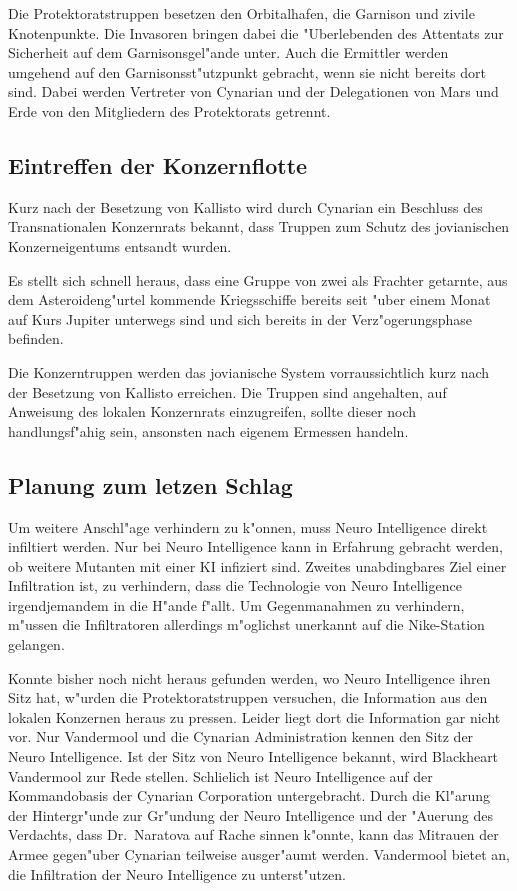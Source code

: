 Die Protektoratstruppen besetzen den Orbitalhafen, die Garnison und zivile Knotenpunkte. Die Invasoren bringen dabei die "Uberlebenden des Attentats zur Sicherheit auf dem Garnisonsgel"ande unter. Auch die Ermittler werden umgehend auf den Garnisonsst"utzpunkt gebracht, wenn sie nicht bereits dort sind. Dabei werden Vertreter von Cynarian und der Delegationen von Mars und Erde von den Mitgliedern des Protektorats getrennt.

\subsection{Eintreffen der Konzernflotte}

Kurz nach der Besetzung von Kallisto wird durch Cynarian ein Beschluss des Transnationalen Konzernrats bekannt, dass Truppen zum Schutz des jovianischen Konzerneigentums entsandt wurden.

Es stellt sich schnell heraus, dass eine Gruppe von zwei als Frachter getarnte, aus dem Asteroideng"urtel kommende Kriegsschiffe bereits seit "uber einem Monat auf Kurs Jupiter unterwegs sind und sich bereits in der Verz"ogerungsphase befinden.

Die Konzerntruppen werden das jovianische System vorraussichtlich kurz nach der Besetzung von Kallisto erreichen. Die Truppen sind angehalten, auf Anweisung des lokalen Konzernrats einzugreifen, sollte dieser noch handlungsf"ahig sein, ansonsten nach eigenem Ermessen handeln.

\subsection{Planung zum letzen Schlag}

Um weitere Anschl"age verhindern zu k"onnen, muss Neuro Intelligence direkt infiltiert werden. Nur bei Neuro Intelligence kann in Erfahrung gebracht werden, ob weitere Mutanten mit einer KI infiziert sind. Zweites unabdingbares Ziel einer Infiltration ist, zu verhindern, dass die Technologie von Neuro Intelligence irgendjemandem in die H"ande f"allt. Um Gegenma\3nahmen zu verhindern, m"ussen die Infiltratoren allerdings m"oglichst unerkannt auf die Nike-Station gelangen.

Konnte bisher noch nicht heraus gefunden werden, wo Neuro Intelligence ihren Sitz hat, w"urden die Protektoratstruppen versuchen, die Information aus den lokalen Konzernen heraus zu pressen. Leider liegt dort die Information gar nicht vor. Nur Vandermool und die Cynarian Administration kennen den Sitz der Neuro Intelligence. Ist der Sitz von Neuro Intelligence bekannt, wird Blackheart Vandermool zur Rede stellen. Schlie\3lich ist Neuro Intelligence auf der Kommandobasis der Cynarian Corporation untergebracht. Durch die Kl"arung der Hintergr"unde zur Gr"undung der Neuro Intelligence und der "Au\3erung des Verdachts, dass Dr.~Naratova auf Rache sinnen k"onnte, kann das Mi\3trauen der Armee gegen"uber Cynarian teilweise ausger"aumt werden. Vandermool bietet an, die Infiltration der Neuro Intelligence zu unterst"utzen.

